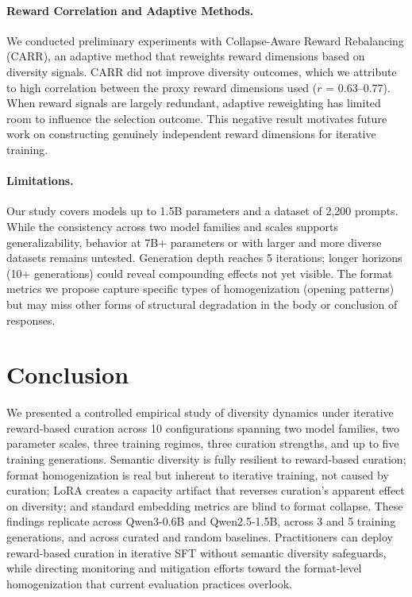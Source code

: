 \documentclass[11pt,a4paper]{article}
\begin{document}
\paragraph{Reward Correlation and Adaptive Methods.}
We conducted preliminary experiments with Collapse-Aware Reward Rebalancing (CARR), an adaptive method that reweights reward dimensions based on diversity signals. CARR did not improve diversity outcomes, which we attribute to high correlation between the proxy reward dimensions used ($r$ = 0.63--0.77). When reward signals are largely redundant, adaptive reweighting has limited room to influence the selection outcome. This negative result motivates future work on constructing genuinely independent reward dimensions for iterative training.

\paragraph{Limitations.}
Our study covers models up to 1.5B parameters and a dataset of 2,200 prompts. While the consistency across two model families and scales supports generalizability, behavior at 7B+ parameters or with larger and more diverse datasets remains untested. Generation depth reaches 5 iterations; longer horizons (10+ generations) could reveal compounding effects not yet visible. The format metrics we propose capture specific types of homogenization (opening patterns) but may miss other forms of structural degradation in the body or conclusion of responses.

\section{Conclusion}

We presented a controlled empirical study of diversity dynamics under iterative reward-based curation across 10 configurations spanning two model families, two parameter scales, three training regimes, three curation strengths, and up to five training generations. Semantic diversity is fully resilient to reward-based curation; format homogenization is real but inherent to iterative training, not caused by curation; LoRA creates a capacity artifact that reverses curation's apparent effect on diversity; and standard embedding metrics are blind to format collapse. These findings replicate across Qwen3-0.6B and Qwen2.5-1.5B, across 3 and 5 training generations, and across curated and random baselines. Practitioners can deploy reward-based curation in iterative SFT without semantic diversity safeguards, while directing monitoring and mitigation efforts toward the format-level homogenization that current evaluation practices overlook.
\end{document}
